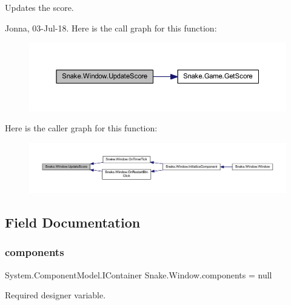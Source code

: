 Updates the score. 

Jonna, 03-\/\+Jul-\/18. Here is the call graph for this function\+:
\nopagebreak
\begin{figure}[H]
\begin{center}
\leavevmode
\includegraphics[width=350pt]{d8/dae/class_snake_1_1_window_ad7ff8d320d8b689f6c4df5170f922030_cgraph}
\end{center}
\end{figure}
Here is the caller graph for this function\+:
\nopagebreak
\begin{figure}[H]
\begin{center}
\leavevmode
\includegraphics[width=350pt]{d8/dae/class_snake_1_1_window_ad7ff8d320d8b689f6c4df5170f922030_icgraph}
\end{center}
\end{figure}


\subsection{Field Documentation}
\mbox{\label{class_snake_1_1_window_aeb5780622794e2bb196f67adfdaa7b55}} 
\subsubsection{\texorpdfstring{components}{components}}
{\footnotesize\ttfamily System.\+Component\+Model.\+I\+Container Snake.\+Window.\+components = null\hspace{0.3cm}{\ttfamily [private]}}



Required designer variable. 

\mbox{\label{class_snake_1_1_window_ad3db1ce4b9762bfe200fc4edaa82c7be}} 
